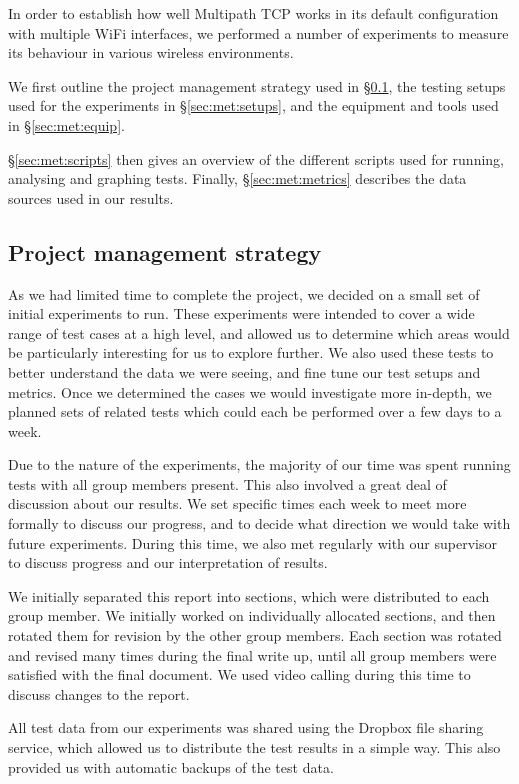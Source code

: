 In order to establish how well Multipath TCP works in its default configuration
with multiple WiFi interfaces, we performed a number of experiments to
measure its behaviour in various wireless environments.

We first outline the project management strategy used in \S\ref{sec:met:pm}, 
the testing setups used for the experiments in \S\ref{sec:met:setups}, 
and the equipment and tools used in \S\ref{sec:met:equip}.

\S\ref{sec:met:scripts} then gives an overview of the different scripts used for
running, analysing and graphing tests. Finally, \S\ref{sec:met:metrics}
describes the data sources used in our results.

\subsection{Project management strategy}
\label{sec:met:pm}
As we had limited time to complete the project, we decided on a small set
of initial experiments to run. These experiments were intended
to cover a wide range of test cases at a high level, and allowed us to determine
which areas would be particularly interesting for us to explore further.
We also used these tests to better understand the data we were seeing, and
fine tune our test setups and metrics. Once we determined the cases we would
investigate more in-depth, we planned sets of related tests which could
each be performed over a few days to a week.

Due to the nature of the experiments, the majority of our time was spent
running tests with all group members present. This also involved a great
deal of discussion about our results. We set specific times each week to
meet more formally to discuss our progress, and to decide what direction we would
take with future experiments. During this time, we also met regularly with
our supervisor to discuss progress and our interpretation of results.

We initially separated this report into sections, which were distributed to
each group member. We initially worked on individually allocated sections, and
then rotated them  for revision by the other group members. Each section was
rotated and revised many times during the final write up, until all group members
were satisfied with the final document. We used video calling during this time
to discuss changes to the report.

All test data from our experiments was shared using the Dropbox file sharing
service, which allowed us to distribute the test results in a simple way. This also
provided us with automatic backups of the test data.

